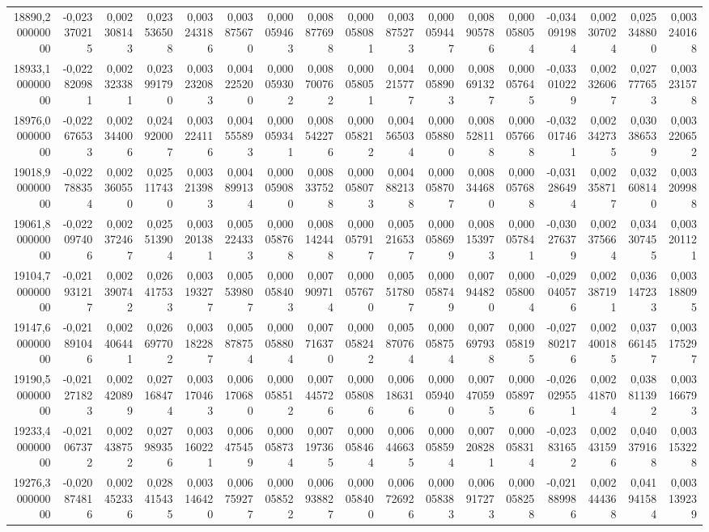 \begin{longtable}{rrrrrrrrrrrrrrrrr}
18890,200000000 & -0,023370215 & 0,002308143 & 0,023536508 & 0,003243186 & 0,003875670 & 0,000059463 & 0,008877698 & 0,000058081 & 0,003875273 & 0,000059447 & 0,008905786 & 0,000058054 & -0,034091984 & 0,002307024 & 0,025348800 & 0,003240168\\
18933,100000000 & -0,022820981 & 0,002323381 & 0,023991790 & 0,003232083 & 0,004225200 & 0,000059302 & 0,008700762 & 0,000058051 & 0,004215777 & 0,000058903 & 0,008691327 & 0,000057645 & -0,033010229 & 0,002326067 & 0,027777653 & 0,003231578\\
18976,000000000 & -0,022676533 & 0,002344006 & 0,024920007 & 0,003224116 & 0,004555893 & 0,000059341 & 0,008542276 & 0,000058212 & 0,004565034 & 0,000058800 & 0,008528118 & 0,000057668 & -0,032017461 & 0,002342735 & 0,030386539 & 0,003220652\\
19018,900000000 & -0,022788354 & 0,002360550 & 0,025117430 & 0,003213983 & 0,004899134 & 0,000059080 & 0,008337528 & 0,000058073 & 0,004882138 & 0,000058707 & 0,008344680 & 0,000057688 & -0,031286494 & 0,002358717 & 0,032608140 & 0,003209988\\
19061,800000000 & -0,022097406 & 0,002372467 & 0,025513904 & 0,003201381 & 0,005224333 & 0,000058768 & 0,008142448 & 0,000057917 & 0,005216537 & 0,000058699 & 0,008153973 & 0,000057841 & -0,030276379 & 0,002375664 & 0,034307455 & 0,003201121\\
19104,700000000 & -0,021931217 & 0,002390742 & 0,026417533 & 0,003193277 & 0,005539807 & 0,000058403 & 0,007909714 & 0,000057670 & 0,005517807 & 0,000058749 & 0,007944820 & 0,000058004 & -0,029040576 & 0,002387191 & 0,036147233 & 0,003188095\\
19147,600000000 & -0,021891046 & 0,002406441 & 0,026697702 & 0,003182287 & 0,005878754 & 0,000058804 & 0,007716370 & 0,000058242 & 0,005870764 & 0,000058754 & 0,007697938 & 0,000058195 & -0,027802176 & 0,002400185 & 0,037661457 & 0,003175297\\
19190,500000000 & -0,021271823 & 0,002420899 & 0,027168474 & 0,003170463 & 0,006170680 & 0,000058512 & 0,007445726 & 0,000058086 & 0,006186316 & 0,000059400 & 0,007470595 & 0,000058976 & -0,026029551 & 0,002418704 & 0,038811392 & 0,003166793\\
19233,400000000 & -0,021067372 & 0,002438752 & 0,027989356 & 0,003160221 & 0,006475459 & 0,000058734 & 0,007197365 & 0,000058464 & 0,006446635 & 0,000058594 & 0,007208281 & 0,000058314 & -0,023831652 & 0,002431596 & 0,040379168 & 0,003153228\\
19276,300000000 & -0,020874816 & 0,002452336 & 0,028415435 & 0,003146420 & 0,006759277 & 0,000058522 & 0,006938827 & 0,000058400 & 0,006726926 & 0,000058383 & 0,006917273 & 0,000058258 & -0,021889986 & 0,002444368 & 0,041941584 & 0,003139239\\

\end{longtable}
